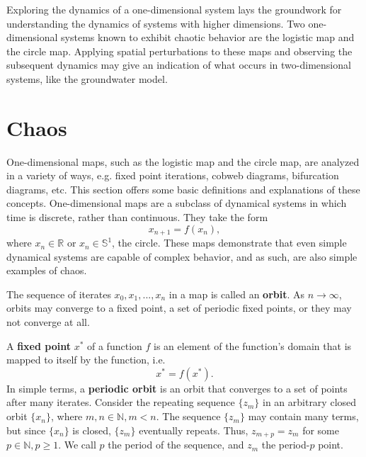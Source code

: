Exploring the dynamics of a one-dimensional system lays the groundwork
for understanding the dynamics of systems with higher dimensions. Two
one-dimensional systems known to exhibit chaotic behavior are the
logistic map and the circle map. Applying spatial perturbations to
these maps and observing the subsequent dynamics may give an
indication of what occurs in two-dimensional systems, like the
groundwater model. 

\section{Chaos}
One-dimensional maps, such as the logistic map and the circle map, are
analyzed in a variety of ways, e.g. fixed point iterations,
cobweb diagrams, bifurcation diagrams, etc. This section offers some
basic definitions and explanations of these concepts. One-dimensional maps are a
subclass of dynamical systems in which time is discrete, rather than
continuous. They take the form
\begin{equation*}
x_{n+1}=f(x_n),
\end{equation*}
where $x_n \in \mathbb{R}$ or $x_n \in \mathbb{S}^1$, the circle. These maps demonstrate that even simple dynamical systems are capable
of complex behavior, and as such, are also simple examples of chaos. 

The sequence of iterates ${x_0,x_1,...,x_n}$ in a map is
called an \textbf{orbit}. As $n \to \infty$, orbits may converge to a fixed point, a
set of periodic fixed points, or they may not converge at all. 

A \textbf{fixed point} $x^*$ of a function $f$ is an element of the
function's domain that is mapped to itself by the function, i.e.
\begin{equation*}
x^* = f(x^*).
\end{equation*}
In simple terms, a \textbf{periodic orbit} is an orbit that converges to a set
of points after many iterates. Consider the repeating sequence $\{z_m\}$
in an arbitrary closed orbit $\{x_n\}$, where $m,n \in \mathbb{N},
m<n$. The sequence $\{z_m\}$ may contain many terms, but since
$\{x_n\}$ is closed, $\{z_m\}$ eventually repeats. Thus, $z_{m+p}=z_m$
for some $p \in \mathbb{N}, p\geq 1$. We call $p$ the period of the
sequence, and $z_m$ the period-$p$ point. 

